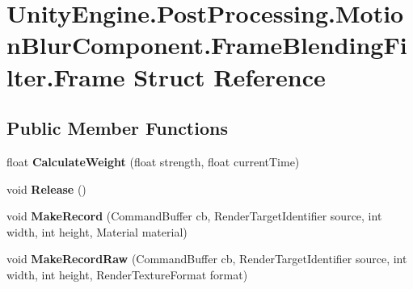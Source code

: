 \hypertarget{struct_unity_engine_1_1_post_processing_1_1_motion_blur_component_1_1_frame_blending_filter_1_1_frame}{}\section{Unity\+Engine.\+Post\+Processing.\+Motion\+Blur\+Component.\+Frame\+Blending\+Filter.\+Frame Struct Reference}
\label{struct_unity_engine_1_1_post_processing_1_1_motion_blur_component_1_1_frame_blending_filter_1_1_frame}
\subsection*{Public Member Functions}
\begin{DoxyCompactItemize}
\item 
\mbox{\label{struct_unity_engine_1_1_post_processing_1_1_motion_blur_component_1_1_frame_blending_filter_1_1_frame_a8ac9a979f44aa0348657b88f5afb73e4}} 
float {\bfseries Calculate\+Weight} (float strength, float current\+Time)
\item 
\mbox{\label{struct_unity_engine_1_1_post_processing_1_1_motion_blur_component_1_1_frame_blending_filter_1_1_frame_a8b8816199f3a58a1720dd67af9d39a24}} 
void {\bfseries Release} ()
\item 
\mbox{\label{struct_unity_engine_1_1_post_processing_1_1_motion_blur_component_1_1_frame_blending_filter_1_1_frame_aea8c8736b5a3b0be40fbdd2df99b682d}} 
void {\bfseries Make\+Record} (Command\+Buffer cb, Render\+Target\+Identifier source, int width, int height, Material material)
\item 
\mbox{\label{struct_unity_engine_1_1_post_processing_1_1_motion_blur_component_1_1_frame_blending_filter_1_1_frame_ad0676c06fc730e6276d2e5f9d9d6593e}} 
void {\bfseries Make\+Record\+Raw} (Command\+Buffer cb, Render\+Target\+Identifier source, int width, int height, Render\+Texture\+Format format)
\end{DoxyCompactItemize}
